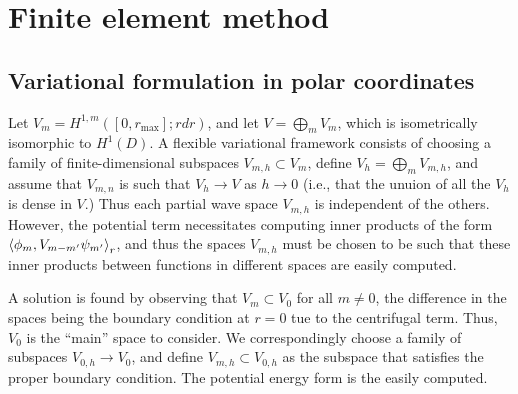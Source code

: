 \documentclass[12pt]{article}
\begin{document}



\section{Finite element method}

\subsection{Variational formulation in polar coordinates}

Let $V_m = H^{1,m}([0,r_\text{max}];r dr)$, and let $V = \bigoplus_m V_m$, which is isometrically isomorphic to $H^1(D)$. A flexible variational framework consists of choosing a family of finite-dimensional subspaces $V_{m,h} \subset V_{m}$, define $V_h = \bigoplus_m V_{m,h}$, and assume that $V_{m,n}$ is such that $V_h \to V$ as $h\to 0$ (i.e., that the unuion of all the $V_h$ is dense in $V$.) Thus each partial wave space $V_{m,h}$ is independent of the others. However, the potential term necessitates computing inner products of the form $\braket{\phi_m, V_{m-m'} \psi_{m'}}_r$, and thus the spaces $V_{m,h}$ must be chosen to be such that these inner products between functions in different spaces are easily computed.

A solution is found by observing that $V_m \subset V_0$ for all $m\neq 0$, the difference in the spaces being the boundary condition at $r=0$ tue to the centrifugal term. Thus, $V_0$ is the ``main'' space to consider. We correspondingly choose a family of subspaces $V_{0,h} \to V_0$, and define $V_{m,h} \subset V_{0,h}$ as the subspace that satisfies the proper boundary condition. The potential energy form is the easily computed.
\end{document}
